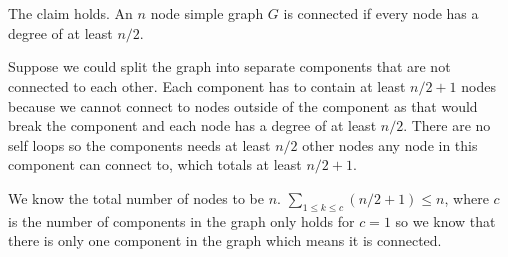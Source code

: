 \documentclass[12pt, a4paper]{article}
\begin{document}
\section{} %

\section{} %
The claim holds. An $n$ node simple graph $G$ is connected if every node has a degree of at least $n/2$.

Suppose we could split the graph into separate components that are not connected to each other. Each component has to contain at least $n/2 + 1$ nodes because we cannot connect to nodes outside of the component as that would break the component and each node has a degree of at least $n/2$. There are no self loops so the components needs at least $n/2$ other nodes any node in this component can connect to, which totals at least $n/2 + 1$.

We know the total number of nodes to be $n$. $\sum_{1 \leq k \leq c} (n/2 + 1) \leq n$, where $c$ is the number of components in the graph only holds for $c = 1$ so we know that there is only one component in the graph which means it is connected.
\end{document}
